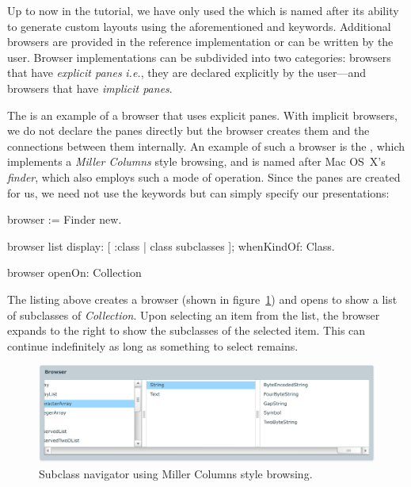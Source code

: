 \documentclass[a4paper,10pt,twoside]{book}
\begin{document}
Up to now in the tutorial, we have only used the  which is named after its ability to generate custom layouts using the aforementioned  and  keywords. Additional browsers are provided in the reference implementation or can be written by the user. Browser implementations can be subdivided into two categories: browsers that have \emph{explicit panes} \emph{i.e.}, they are declared explicitly by the user---and browsers that have \emph{implicit panes}. 

The  is an example of a browser that uses
explicit panes. With implicit browsers, we do not declare the panes
directly but the browser creates them and the connections between them
internally. An example of such a browser is the , which
implements a \emph{Miller Columns} style browsing, and is named after
Mac OS~X’s \emph{finder}, which also employs such a mode of
operation. Since the panes are created for us, we need not use the
 keywords but can simply specify our presentations:

\begin{code}{}
browser := Finder new.

browser list
	display: [ :class | class subclasses ];
	whenKindOf: Class.

browser openOn: Collection
\end{code}

The listing above creates a browser (shown in figure~\ref{fig:finder}) and opens to show a list of subclasses of \emph{Collection}. Upon selecting an item from the list, the browser expands to the right to show the subclasses of the selected item. This can continue indefinitely as long as something to select remains.

\begin{figure}[htbp]
\centerline{\includegraphics[width=\linewidth]{finder.pdf}}
\caption{Subclass navigator using Miller Columns style browsing.}
\label{fig:finder}
\end{figure}

\end{document}
